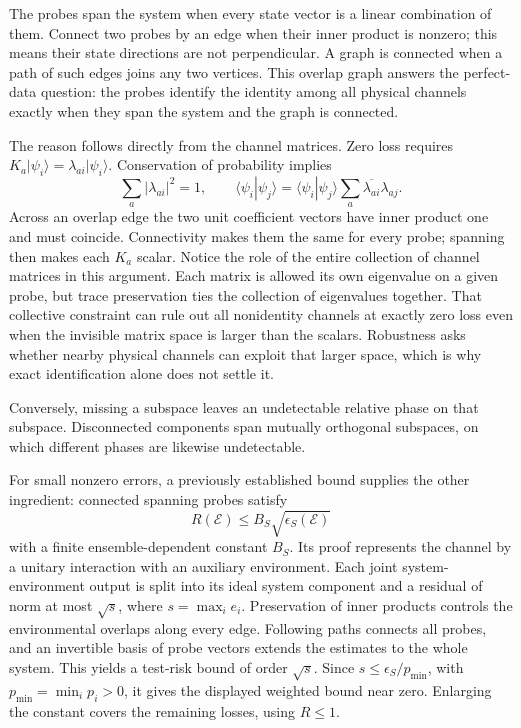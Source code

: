 \documentclass[11pt,a4paper]{article}
\newcommand{\ket}[1]{\lvert #1\rangle}
\numberwithin{equation}{section}
\begin{document}
The probes span the system when every state vector is a linear combination of them. Connect two probes by an edge when their inner product is nonzero; this means their state directions are not perpendicular. A graph is connected when a path of such edges joins any two vertices. This overlap graph answers the perfect-data question: the probes identify the identity among all physical channels exactly when they span the system and the graph is connected.

The reason follows directly from the channel matrices. Zero loss requires $K_a\ket{\psi_i}=\lambda_{ai}\ket{\psi_i}$. Conservation of probability implies
\[
\sum_a|\lambda_{ai}|^2=1,\qquad
\langle\psi_i|\psi_j\rangle
=\langle\psi_i|\psi_j\rangle
  \sum_a\overline{\lambda_{ai}}\lambda_{aj}.
\]
Across an overlap edge the two unit coefficient vectors have inner product one and must coincide. Connectivity makes them the same for every probe; spanning then makes each $K_a$ scalar. Notice the role of the entire collection of channel matrices in this argument. Each matrix is allowed its own eigenvalue on a given probe, but trace preservation ties the collection of eigenvalues together. That collective constraint can rule out all nonidentity channels at exactly zero loss even when the invisible matrix space is larger than the scalars. Robustness asks whether nearby physical channels can exploit that larger space, which is why exact identification alone does not settle it.

Conversely, missing a subspace leaves an undetectable relative phase on that subspace. Disconnected components span mutually orthogonal subspaces, on which different phases are likewise undetectable.

For small nonzero errors, a previously established bound supplies the other ingredient: connected spanning probes satisfy
\[
R(\mathcal E)\leq B_S\sqrt{\epsilon_S(\mathcal E)}
\]
with a finite ensemble-dependent constant $B_S$. Its proof represents the channel by a unitary interaction with an auxiliary environment. Each joint system-environment output is split into its ideal system component and a residual of norm at most $\sqrt{s}$, where $s=\max_i e_i$. Preservation of inner products controls the environmental overlaps along every edge. Following paths connects all probes, and an invertible basis of probe vectors extends the estimates to the whole system. This yields a test-risk bound of order $\sqrt{s}$. Since $s\leq\epsilon_S/p_{\min}$, with $p_{\min}=\min_i p_i>0$, it gives the displayed weighted bound near zero. Enlarging the constant covers the remaining losses, using $R\leq1$.
\end{document}
